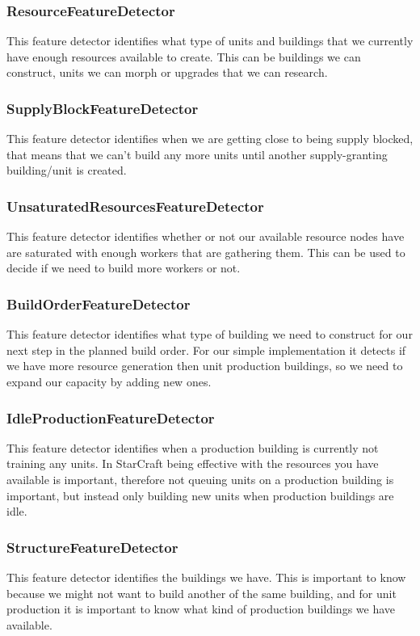 \subsubsection{ResourceFeatureDetector}
This feature detector identifies what type of units and buildings that we currently have enough resources available to create. This can be buildings we can construct, units we can morph or upgrades that we can research.

\subsubsection{SupplyBlockFeatureDetector}
This feature detector identifies when we are getting close to being supply blocked, that means that we can't build any more units until another supply-granting building/unit is created.

\subsubsection{UnsaturatedResourcesFeatureDetector}
This feature detector identifies whether or not our available resource nodes have are saturated with enough workers that are gathering them. This can be used to decide if we need to build more workers or not.

\subsubsection{BuildOrderFeatureDetector}
This feature detector identifies what type of building we need to construct for our next step in the planned build order. For our simple implementation it detects if we have more resource generation then unit production buildings, so we need to expand our capacity by adding new ones.

\subsubsection{IdleProductionFeatureDetector}
This feature detector identifies when a production building is currently not training any units. In StarCraft being effective with the resources you have available is important, therefore not queuing units on a production building is important, but instead only building new units when production buildings are idle.

\subsubsection{StructureFeatureDetector}
This feature detector identifies the buildings we have. This is important to know because we might not want to build another of the same building, and for unit production it is important to know what kind of production buildings we have available.

